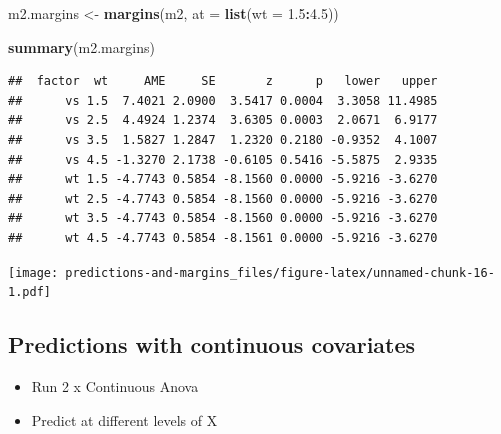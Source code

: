 \documentclass[]{article}
\newenvironment{Shaded}{\begin{snugshade}}{\end{snugshade}}
\newcommand{\KeywordTok}[1]{\textcolor[rgb]{0.13,0.29,0.53}{\textbf{#1}}}
\newcommand{\DataTypeTok}[1]{\textcolor[rgb]{0.13,0.29,0.53}{#1}}
\newcommand{\FloatTok}[1]{\textcolor[rgb]{0.00,0.00,0.81}{#1}}
\newcommand{\StringTok}[1]{\textcolor[rgb]{0.31,0.60,0.02}{#1}}
\newcommand{\OperatorTok}[1]{\textcolor[rgb]{0.81,0.36,0.00}{\textbf{#1}}}
\newcommand{\NormalTok}[1]{#1}
\providecommand{\tightlist}{%
  \setlength{\itemsep}{0pt}\setlength{\parskip}{0pt}}
\theoremstyle{definition}
\theoremstyle{definition}
\theoremstyle{definition}
\theoremstyle{remark}
\begin{document}
\begin{Shaded}
\begin{Highlighting}[]
\NormalTok{m2.margins <-}\StringTok{ }\KeywordTok{margins}\NormalTok{(m2, }\DataTypeTok{at =} \KeywordTok{list}\NormalTok{(}\DataTypeTok{wt =} \FloatTok{1.5}\OperatorTok{:}\FloatTok{4.5}\NormalTok{))}

\KeywordTok{summary}\NormalTok{(m2.margins)}
\end{Highlighting}
\end{Shaded}

\begin{verbatim}
##  factor  wt     AME     SE       z      p   lower   upper
##      vs 1.5  7.4021 2.0900  3.5417 0.0004  3.3058 11.4985
##      vs 2.5  4.4924 1.2374  3.6305 0.0003  2.0671  6.9177
##      vs 3.5  1.5827 1.2847  1.2320 0.2180 -0.9352  4.1007
##      vs 4.5 -1.3270 2.1738 -0.6105 0.5416 -5.5875  2.9335
##      wt 1.5 -4.7743 0.5854 -8.1560 0.0000 -5.9216 -3.6270
##      wt 2.5 -4.7743 0.5854 -8.1560 0.0000 -5.9216 -3.6270
##      wt 3.5 -4.7743 0.5854 -8.1560 0.0000 -5.9216 -3.6270
##      wt 4.5 -4.7743 0.5854 -8.1561 0.0000 -5.9216 -3.6270
\end{verbatim}

\begin{Shaded}
\end{Shaded}

\texttt{[image: predictions-and-margins\_files/figure-latex/unnamed-chunk-16-1.pdf]}

\subsection*{Predictions with continuous
covariates}\label{predictions-with-continuous-covariates}

\begin{itemize}
\tightlist
\item
  Run 2 x Continuous Anova
\item
  Predict at different levels of X
\end{itemize}
\end{document}
